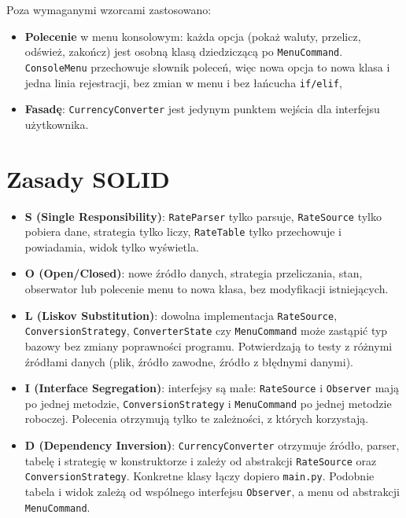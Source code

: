\documentclass[12pt,a4paper]{article}
\begin{document}
Poza wymaganymi wzorcami zastosowano:
\begin{itemize}
    \item \textbf{Polecenie} w menu konsolowym: każda opcja (pokaż waluty, przelicz, odśwież, zakończ) jest osobną klasą dziedziczącą po \texttt{MenuCommand}. \texttt{ConsoleMenu} przechowuje słownik poleceń, więc nowa opcja to nowa klasa i jedna linia rejestracji, bez zmian w menu i bez łańcucha \texttt{if/elif},
    \item \textbf{Fasadę}: \texttt{CurrencyConverter} jest jedynym punktem wejścia dla interfejsu użytkownika.
\end{itemize}

\section{Zasady SOLID}

\begin{itemize}
    \item \textbf{S (Single Responsibility)}: \texttt{RateParser} tylko parsuje, \texttt{RateSource} tylko pobiera dane, strategia tylko liczy, \texttt{RateTable} tylko przechowuje i powiadamia, widok tylko wyświetla.
    \item \textbf{O (Open/Closed)}: nowe źródło danych, strategia przeliczania, stan, obserwator lub polecenie menu to nowa klasa, bez modyfikacji istniejących.
    \item \textbf{L (Liskov Substitution)}: dowolna implementacja \texttt{RateSource}, \texttt{ConversionStrategy}, \texttt{ConverterState} czy \texttt{MenuCommand} może zastąpić typ bazowy bez zmiany poprawności programu. Potwierdzają to testy z różnymi źródłami danych (plik, źródło zawodne, źródło z błędnymi danymi).
    \item \textbf{I (Interface Segregation)}: interfejsy są małe: \texttt{RateSource} i \texttt{Observer} mają po jednej metodzie, \texttt{ConversionStrategy} i \texttt{MenuCommand} po jednej metodzie roboczej. Polecenia otrzymują tylko te zależności, z których korzystają.
    \item \textbf{D (Dependency Inversion)}: \texttt{CurrencyConverter} otrzymuje źródło, parser, tabelę i strategię w konstruktorze i zależy od abstrakcji \texttt{RateSource} oraz \texttt{ConversionStrategy}. Konkretne klasy łączy dopiero \texttt{main.py}. Podobnie tabela i widok zależą od wspólnego interfejsu \texttt{Observer}, a menu od abstrakcji \texttt{MenuCommand}.
\end{itemize}
\end{document}
